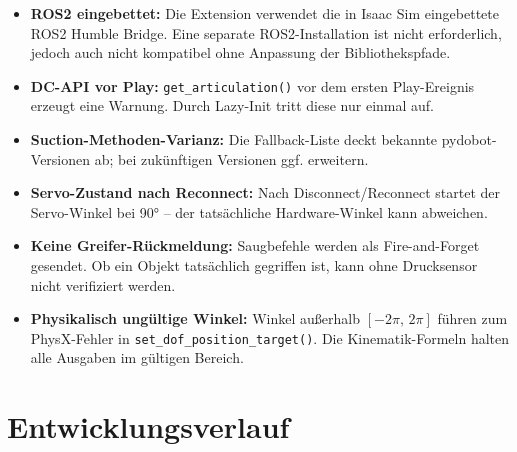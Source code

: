 \documentclass[11pt,a4paper]{article}
\begin{document}
\begin{itemize}
  \item \textbf{ROS2 eingebettet:}
        Die Extension verwendet die in Isaac Sim eingebettete
        ROS2 Humble Bridge. Eine separate ROS2-Installation ist
        nicht erforderlich, jedoch auch nicht kompatibel ohne
        Anpassung der Bibliothekspfade.

  \item \textbf{DC-API vor Play:}
        \texttt{get\_articulation()} vor dem ersten Play-Ereignis
        erzeugt eine Warnung. Durch Lazy-Init tritt diese nur
        einmal auf.

  \item \textbf{Suction-Methoden-Varianz:}
        Die Fallback-Liste deckt bekannte pydobot-Versionen ab;
        bei zukünftigen Versionen ggf. erweitern.

  \item \textbf{Servo-Zustand nach Reconnect:}
        Nach Disconnect/Reconnect startet der Servo-Winkel bei
        90° -- der tatsächliche Hardware-Winkel kann abweichen.

  \item \textbf{Keine Greifer-Rückmeldung:}
        Saugbefehle werden als Fire-and-Forget gesendet.
        Ob ein Objekt tatsächlich gegriffen ist, kann ohne
        Drucksensor nicht verifiziert werden.

  \item \textbf{Physikalisch ungültige Winkel:}
        Winkel außerhalb $[-2\pi,\, 2\pi]$ führen zum
        PhysX-Fehler in \texttt{set\_dof\_position\_target()}.
        Die Kinematik-Formeln halten alle Ausgaben im gültigen
        Bereich.
\end{itemize}

\section{Entwicklungsverlauf}
\label{sec:verlauf}
\end{document}
